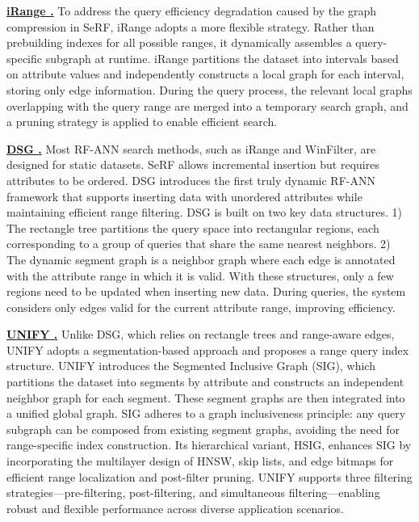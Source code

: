 \documentclass[sigconf, nonacm]{acmart}
\begin{document}
\begin{sloppypar}
\vspace{1em}
\noindent\textbf{\underline{iRange \cite{iRangeGraph}.}}  
To address the query efficiency degradation caused by the graph compression in SeRF, iRange adopts a more flexible strategy. Rather than prebuilding indexes for all possible ranges, it dynamically assembles a query-specific subgraph at runtime. iRange partitions the dataset into intervals based on attribute values and independently constructs a local graph for each interval, storing only edge information. During the query process, the relevant local graphs overlapping with the query range are merged into a temporary search graph, and a pruning strategy is applied to enable efficient search.

\vspace{1em}
\noindent\textbf{\underline{DSG \cite{DSG}.}}  
Most RF-ANN search methods, such as iRange and WinFilter, are designed for static datasets. SeRF allows incremental insertion but requires attributes to be ordered. DSG introduces the first truly dynamic RF-ANN framework that supports inserting data with unordered attributes while maintaining efficient range filtering.
DSG is built on two key data structures. 1) The rectangle tree partitions the query space into rectangular regions, each corresponding to a group of queries that share the same nearest neighbors. 2) The dynamic segment graph is a neighbor graph where each edge is annotated with the attribute range in which it is valid.
With these structures, only a few regions need to be updated when inserting new data. During queries, the system considers only edges valid for the current attribute range, improving efficiency.



\vspace{1em}
\noindent\textbf{\underline{UNIFY \cite{UNIFY}.}}  
Unlike DSG, which relies on rectangle trees and range-aware edges, UNIFY adopts a segmentation-based approach and proposes a range query index structure. UNIFY introduces the Segmented Inclusive Graph (SIG), which partitions the dataset into segments by attribute and constructs an independent neighbor graph for each segment. These segment graphs are then integrated into a unified global graph. SIG adheres to a graph inclusiveness principle: any query subgraph can be composed from existing segment graphs, avoiding the need for range-specific index construction. Its hierarchical variant, HSIG, enhances SIG by incorporating the multilayer design of HNSW, skip lists, and edge bitmaps for efficient range localization and post-filter pruning. UNIFY supports three filtering strategies—pre-filtering, post-filtering, and  simultaneous filtering—enabling robust and flexible performance across diverse application scenarios.




\end{sloppypar}
\end{document}
